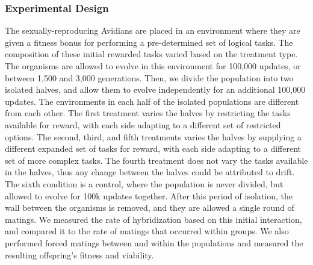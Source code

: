 \subsubsection{Experimental Design}

The sexually-reproducing Avidians are placed in an environment where they are given a fitness bonus for performing a pre-determined set of logical tasks.  The composition of these initial rewarded tasks varied based on the treatment type.
The organisms are allowed to evolve in this environment for 100,000 updates, or between 1,500 and 3,000 generations. Then, we divide the population into two isolated halves, and allow them to evolve independently for an additional 100,000 updates.
The environments in each half of the isolated populations are different from each other. The first treatment varies the halves by restricting the tasks available for reward, with each side adapting to a different set of restricted options. The second, third, and fifth treatments varies the halves by supplying a different expanded set of tasks for reward, with each side adapting to a different set of more complex tasks. The fourth treatment does not vary the tasks available in the halves, thus any change between the halves could be attributed to drift. The sixth condition is a control, where the population is never divided, but allowed to evolve for 100k updates together.
After this period of isolation, the wall between the organisms is removed, and they are allowed a single round of matings. We measured the rate of hybridization based on this initial interaction, and compared it to the rate of matings that occurred within groups. We also performed forced matings between and within the populations and measured the resulting offspring’s fitness and viability.